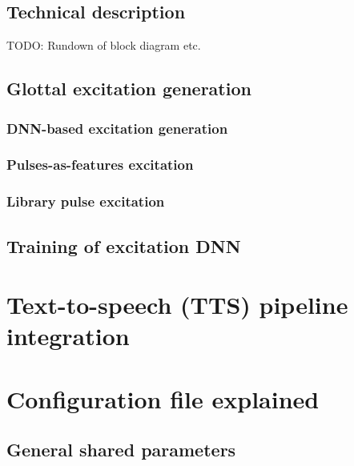 \documentclass[a4paper, 11pt]{article}
\begin{document}
\subsection{Technical description}
TODO: Rundown of block diagram etc.

\subsection{Glottal excitation generation}

\subsubsection{DNN-based excitation generation}

\subsubsection{Pulses-as-features excitation}

\subsubsection{Library pulse excitation}

\subsection{Training of excitation DNN}

\section{Text-to-speech (TTS) pipeline integration}

\section{Configuration file explained}

\subsection{General shared parameters}
\end{document}
